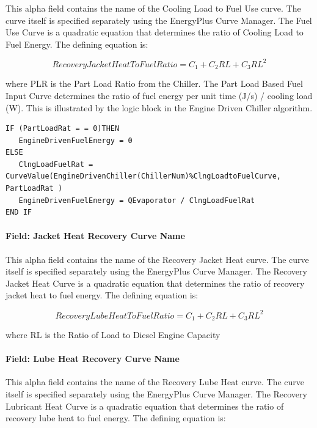 This alpha field contains the name of the Cooling Load to Fuel Use curve. The curve itself is specified separately using the EnergyPlus Curve Manager. The Fuel Use Curve is a quadratic equation that determines the ratio of Cooling Load to Fuel Energy. The defining equation is:

\begin{equation}
    RecoveryJacketHeatToFuelRatio = {C_1} + {C_2}RL + {C_3}R{L^2}
\end{equation}

where PLR is the Part Load Ratio from the Chiller. The Part Load Based Fuel Input Curve determines the ratio of fuel energy per unit time (J/s) / cooling load (W). This is illustrated by the logic block in the Engine Driven Chiller algorithm.

\begin{lstlisting}
IF (PartLoadRat = = 0)THEN
   EngineDrivenFuelEnergy = 0
ELSE
   ClngLoadFuelRat = CurveValue(EngineDrivenChiller(ChillerNum)%ClngLoadtoFuelCurve, PartLoadRat )
   EngineDrivenFuelEnergy = QEvaporator / ClngLoadFuelRat
END IF
\end{lstlisting}

\paragraph{Field: Jacket Heat Recovery Curve Name}\label{field-jacket-heat-recovery-curve-name-000}

This alpha field contains the name of the Recovery Jacket Heat curve. The curve itself is specified separately using the EnergyPlus Curve Manager. The Recovery Jacket Heat Curve is a quadratic equation that determines the ratio of recovery jacket heat to fuel energy. The defining equation is:

\begin{equation}
    RecoveryLubeHeatToFuelRatio = {C_1} + {C_2}RL + {C_3}R{L^2}
\end{equation}

where RL is the Ratio of Load to Diesel Engine Capacity

\paragraph{Field: Lube Heat Recovery Curve Name}\label{field-lube-heat-recovery-curve-name-000}

This alpha field contains the name of the Recovery Lube Heat curve. The curve itself is specified separately using the EnergyPlus Curve Manager. The Recovery Lubricant Heat Curve is a quadratic equation that determines the ratio of recovery lube heat to fuel energy. The defining equation is:


